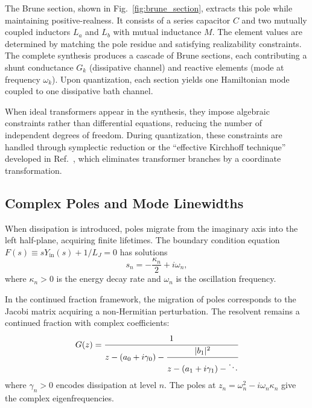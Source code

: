 \documentclass[reprint, floatfix, superscriptaddress, amsmath, amssymb, longbibliography]{revtex4-2}
\begin{document}
The Brune section, shown in Fig.~\ref{fig:brune_section}, extracts this pole while maintaining positive-realness. It consists of a series capacitor $C$ and two mutually coupled inductors $L_a$ and $L_b$ with mutual inductance $M$. The element values are determined by matching the pole residue and satisfying realizability constraints. The complete synthesis produces a cascade of Brune sections, each contributing a shunt conductance $G_k$ (dissipative channel) and reactive elements (mode at frequency $\omega_k$). Upon quantization, each section yields one Hamiltonian mode coupled to one dissipative bath channel.

When ideal transformers appear in the synthesis, they impose algebraic constraints rather than differential equations, reducing the number of independent degrees of freedom. During quantization, these constraints are handled through symplectic reduction or the ``effective Kirchhoff technique'' developed in Ref.~\cite{Solgun2015}, which eliminates transformer branches by a coordinate transformation.

\subsection{Complex Poles and Mode Linewidths}
\label{sec:complex_poles}

When dissipation is introduced, poles migrate from the imaginary axis into the left half-plane, acquiring finite lifetimes. The boundary condition equation $F(s) \equiv sY_{\mathrm{in}}(s) + 1/L_J = 0$ has solutions
\begin{equation}
s_n = -\frac{\kappa_n}{2} + i\omega_n,
\label{eq:complex_pole_form}
\end{equation}
where $\kappa_n > 0$ is the energy decay rate and $\omega_n$ is the oscillation frequency.

In the continued fraction framework, the migration of poles corresponds to the Jacobi matrix acquiring a non-Hermitian perturbation. The resolvent remains a continued fraction with complex coefficients:
\begin{equation}
G(z) = \cfrac{1}{z - (a_0 + i\gamma_0) - \cfrac{|b_1|^2}{z - (a_1 + i\gamma_1) - \ddots}}
\end{equation}
where $\gamma_n > 0$ encodes dissipation at level $n$. The poles at $z_n = \omega_n^2 - i\omega_n\kappa_n$ give the complex eigenfrequencies.
\end{document}
